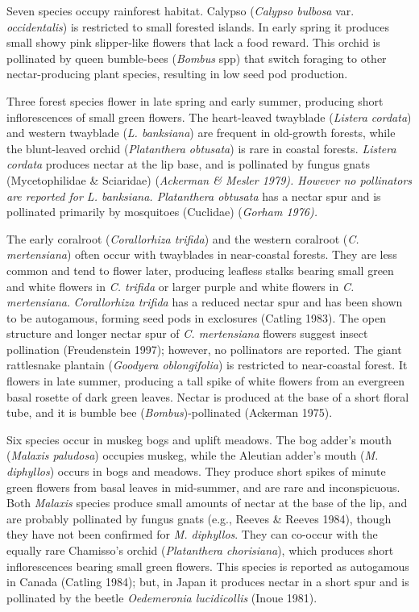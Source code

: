 \begin{multicols}{2}
Seven species occupy rainforest habitat. Calypso (\emph{Calypso bulbosa}
var. \emph{occidentalis}) is restricted to small forested islands. In
early spring it produces small showy pink slipper-like flowers that lack
a food reward. This orchid is pollinated by queen bumble-bees
(\emph{Bombus} spp) that switch foraging to other nectar-producing plant
species, resulting in low seed pod production.

Three forest species flower in late spring and early summer, producing
short inflorescences of small green flowers. The heart-leaved twayblade
(\emph{Listera cordata}) and western twayblade (\emph{L. banksiana}) are
frequent in old-growth forests, while the blunt-leaved orchid
(\emph{Platanthera obtusata}) is rare in coastal forests. \emph{Listera
cordata} produces nectar at the lip base, and is pollinated by fungus
gnats (Mycetophilidae \& Sciaridae) (\emph{Ackerman \& Mesler 1979).
However no pollinators are reported for L. banksiana. Platanthera
obtusata} has a nectar spur and is pollinated primarily by mosquitoes
(Cuclidae) (\emph{Gorham 1976).}

The early coralroot (\emph{Corallorhiza trifida}) and the western
coralroot (\emph{C. mertensiana}) often occur with twayblades in
near-coastal forests. They are less common and tend to flower later,
producing leafless stalks bearing small green and white flowers in
\emph{C. trifida} or larger purple and white flowers in \emph{C.
mertensiana}. \emph{Corallorhiza trifida} has a reduced nectar spur and
has been shown to be autogamous, forming seed pods in exclosures
(Catling 1983). The open structure and longer nectar spur of \emph{C.
mertensiana} flowers suggest insect pollination (Freudenstein 1997);
however, no pollinators are reported. The giant rattlesnake plantain
(\emph{Goodyera oblongifolia}) is restricted to near-coastal forest. It
flowers in late summer, producing a tall spike of white flowers from an
evergreen basal rosette of dark green leaves. Nectar is produced at the
base of a short floral tube, and it is bumble bee
(\emph{Bombus})-pollinated (Ackerman 1975).

Six species occur in muskeg bogs and uplift meadows. The bog adder's
mouth (\emph{Malaxis paludosa}) occupies muskeg, while the Aleutian
adder's mouth (\emph{M. diphyllos}) occurs in bogs and meadows. They
produce short spikes of minute green flowers from basal leaves in
mid-summer, and are rare and inconspicuous. Both \emph{Malaxis} species
produce small amounts of nectar at the base of the lip, and are probably
pollinated by fungus gnats (e.g., Reeves \& Reeves 1984), though they
have not been confirmed for \emph{M. diphyllos}. They can co-occur with
the equally rare Chamisso's orchid (\emph{Platanthera chorisiana}),
which produces short inflorescences bearing small green flowers. This
species is reported as autogamous in Canada (Catling 1984); but, in
Japan it produces nectar in a short spur and is pollinated by the beetle
\emph{Oedemeronia lucidicollis} (Inoue 1981).


\end{multicols}
